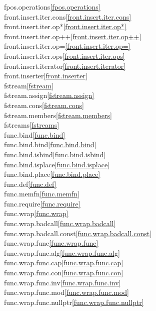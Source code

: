 \begin{multicols}{2}
fpos.operations\quad\ref{fpos.operations}\\
front.insert.iter.cons\quad\ref{front.insert.iter.cons}\\
front.insert.iter.op*\quad\ref{front.insert.iter.op*}\\
front.insert.iter.op++\quad\ref{front.insert.iter.op++}\\
front.insert.iter.op=\quad\ref{front.insert.iter.op=}\\
front.insert.iter.ops\quad\ref{front.insert.iter.ops}\\
front.insert.iterator\quad\ref{front.insert.iterator}\\
front.inserter\quad\ref{front.inserter}\\
fstream\quad\ref{fstream}\\
fstream.assign\quad\ref{fstream.assign}\\
fstream.cons\quad\ref{fstream.cons}\\
fstream.members\quad\ref{fstream.members}\\
fstreams\quad\ref{fstreams}\\
func.bind\quad\ref{func.bind}\\
func.bind.bind\quad\ref{func.bind.bind}\\
func.bind.isbind\quad\ref{func.bind.isbind}\\
func.bind.isplace\quad\ref{func.bind.isplace}\\
func.bind.place\quad\ref{func.bind.place}\\
func.def\quad\ref{func.def}\\
func.memfn\quad\ref{func.memfn}\\
func.require\quad\ref{func.require}\\
func.wrap\quad\ref{func.wrap}\\
func.wrap.badcall\quad\ref{func.wrap.badcall}\\
func.wrap.badcall.const\quad\ref{func.wrap.badcall.const}\\
func.wrap.func\quad\ref{func.wrap.func}\\
func.wrap.func.alg\quad\ref{func.wrap.func.alg}\\
func.wrap.func.cap\quad\ref{func.wrap.func.cap}\\
func.wrap.func.con\quad\ref{func.wrap.func.con}\\
func.wrap.func.inv\quad\ref{func.wrap.func.inv}\\
func.wrap.func.mod\quad\ref{func.wrap.func.mod}\\
func.wrap.func.nullptr\quad\ref{func.wrap.func.nullptr}\\

\end{multicols}
